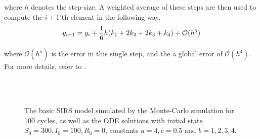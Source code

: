 \documentclass[10pt,showpacs,preprintnumbers,amsmath,amssymb,nofootinbib,aps,prl,twocolumn,groupedaddress,superscriptaddress,showkeys]{revtex4-1}
\begin{document}
    where $h$ denotes the step-size. A weighted average of these steps are then used to compute the $i+1$'th element in the following way.
    \begin{equation}
      y_{i+1} = y_i + \frac{1}{6}h\qty(k_1 + 2k_2 + 2k_3 + k_4) + \mathcal O(h^5)
    \end{equation}

    where $\mathcal O(h^5)$ is the error in this single step, and the a global error of $\mathcal O (h^4)$. For more details, refer to \textcite[p.~250]{compphys_lecnotes}.

\begin{figure}[h!tb]
  \centering
   \\
   \\
  \caption{\label{fig:ab_plots}The basic SIRS model simulated by the Monte-Carlo simulation for 100 cycles, as well as the ODE solutions with initial state $S_0 = 300, I_0 = 100, R_0 = 0$, constants $a=4, c=0.5$ and $b=1,2,3,4$.}
\end{figure}
\end{document}

